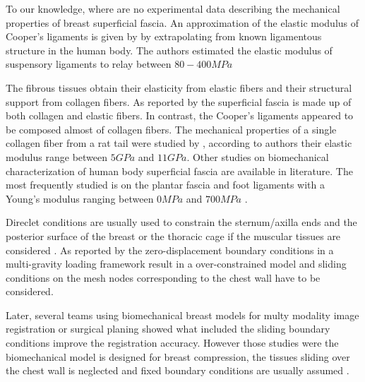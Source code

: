  To our knowledge, where are no experimental data describing the mechanical properties of breast superficial fascia. An approximation of the elastic modulus of Cooper's ligaments is given by \cite{gefen_mechanics_2007} by extrapolating from known ligamentous structure in the human body. The authors estimated the elastic modulus of suspensory ligaments to relay between $80 - 400 MPa$
 
 The fibrous tissues obtain their elasticity from elastic fibers and their structural support from collagen fibers. As reported by \cite{riggio_anatomical_2000} the superficial fascia is made up of both collagen and elastic fibers. In contrast, the Cooper's ligaments appeared to be composed almost of collagen fibers.  The mechanical properties of a single collagen fiber from a rat tail were studied by \cite{wenger_mechanical_2007}, according to authors their elastic modulus range between $5 GPa$ and $11 GPa$. Other studies on biomechanical characterization of human body superficial fascia are available in literature. The most frequently studied is on the plantar fascia and foot ligaments with a Young's modulus ranging between $0 MPa$ and $700 MPa$ \citep{cheung_effects_2004,kongsgaard_mechanical_2011}. 


Direclet conditions are usually used to constrain the sternum/axilla ends and the posterior surface of the breast or the thoracic cage if the muscular tissues are considered \citep{griesenauer_breast_2017,rajagopal_creating_2008,pathmanathan_predicting_2008, gamage_modelling_2012,griesenauer_breast_2017}. As reported by \cite{carter_biomechanical_2009} the zero-displacement boundary conditions in a multi-gravity loading framework result in a over-constrained model and sliding conditions on the mesh nodes corresponding to the chest wall have to be considered.    

  Later, several teams using biomechanical breast models for multy modality image registration or surgical planing showed what included the sliding boundary conditions  \citep{georgii_simulation_2016,han_nonlinear_2014}  improve the registration accuracy. However those studies were the biomechanical model is designed for breast compression, the tissues sliding over the chest wall is neglected and fixed boundary conditions are usually assumed \citep{sturgeon_finite_element_2016, martinez_finite_2017}.
  
 
